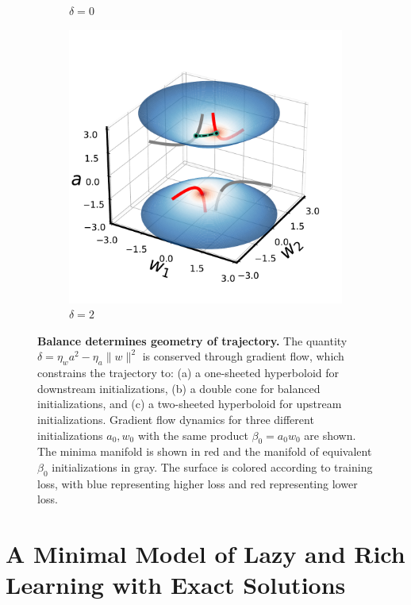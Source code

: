 \documentclass{article}
\theoremstyle{plain}
\theoremstyle{definition}
\theoremstyle{remark}
\begin{document}
\begin{figure}
\begin{subfigure}{0.325\linewidth}
        \caption{$\delta = 0$}
    \end{subfigure}
    \begin{subfigure}{0.325\linewidth}
        \centering
        \includegraphics[width=\linewidth]{fig/single-neuron/positive.pdf}
        \caption{$\delta = 2$}
    \end{subfigure}
    \caption{\textbf{Balance determines geometry of trajectory.}
    The quantity $\delta = \eta_wa^2 - \eta_a\|w\|^2$ is conserved through gradient flow, which constrains the trajectory to: (a) a one-sheeted hyperboloid for downstream initializations, (b) a double cone for balanced initializations, and (c) a two-sheeted hyperboloid for upstream initializations.
    Gradient flow dynamics for three different initializations $a_0, w_0$ with the same product $\beta_0 = a_0w_0$ are shown.
    The minima manifold is shown in red and the manifold of equivalent $\beta_0$ initializations in gray.
    The surface is colored according to training loss, with blue representing higher loss and red representing lower loss.
    }
    \vspace{-8pt}
    \label{fig:single-neuron}
\end{figure}
\vspace{-10pt}
\section{A Minimal Model of Lazy and Rich Learning with Exact Solutions}
\label{sec:single-neuron}
\vspace{-5pt}
\end{document}

